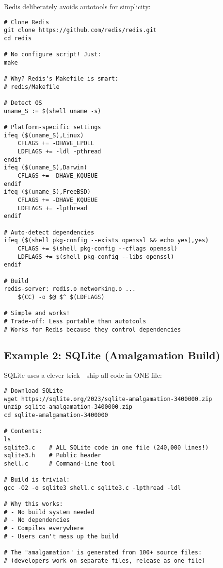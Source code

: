 Redis deliberately avoids autotools for simplicity:

\begin{lstlisting}
# Clone Redis
git clone https://github.com/redis/redis.git
cd redis

# No configure script! Just:
make

# Why? Redis's Makefile is smart:
# redis/Makefile

# Detect OS
uname_S := $(shell uname -s)

# Platform-specific settings
ifeq ($(uname_S),Linux)
    CFLAGS += -DHAVE_EPOLL
    LDFLAGS += -ldl -pthread
endif
ifeq ($(uname_S),Darwin)
    CFLAGS += -DHAVE_KQUEUE
endif
ifeq ($(uname_S),FreeBSD)
    CFLAGS += -DHAVE_KQUEUE
    LDFLAGS += -lpthread
endif

# Auto-detect dependencies
ifeq ($(shell pkg-config --exists openssl && echo yes),yes)
    CFLAGS += $(shell pkg-config --cflags openssl)
    LDFLAGS += $(shell pkg-config --libs openssl)
endif

# Build
redis-server: redis.o networking.o ...
	$(CC) -o $@ $^ $(LDFLAGS)

# Simple and works!
# Trade-off: Less portable than autotools
# Works for Redis because they control dependencies
\end{lstlisting}

\subsection{Example 2: SQLite (Amalgamation Build)}

SQLite uses a clever trick—ship all code in ONE file:

\begin{lstlisting}
# Download SQLite
wget https://sqlite.org/2023/sqlite-amalgamation-3400000.zip
unzip sqlite-amalgamation-3400000.zip
cd sqlite-amalgamation-3400000

# Contents:
ls
sqlite3.c    # ALL SQLite code in one file (240,000 lines!)
sqlite3.h    # Public header
shell.c      # Command-line tool

# Build is trivial:
gcc -O2 -o sqlite3 shell.c sqlite3.c -lpthread -ldl

# Why this works:
# - No build system needed
# - No dependencies
# - Compiles everywhere
# - Users can't mess up the build

# The "amalgamation" is generated from 100+ source files:
# (developers work on separate files, release as one file)
\end{lstlisting}

